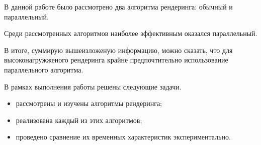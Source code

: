 \Conclusion %

В данной работе было рассмотрено два алгоритма рендеринга: обычный и параллельный.

Среди рассмотренных алгоритмов наиболее эффективным оказался параллельный. 

В итоге, суммирую вышеизложеную информацию, можно сказать, что для высоконагружженого рендеринга крайне предпочтительно использование параллельного алгоритма.

В рамках выполнения работы решены следующие задачи.
\begin{itemize}
    \item рассмотрены и изучены алгоритмы рендеринга;
    \item реализована каждый из этих алгоритмов;
    \item проведено сравнение их временных характеристик экспериментально.
\end{itemize}

 




